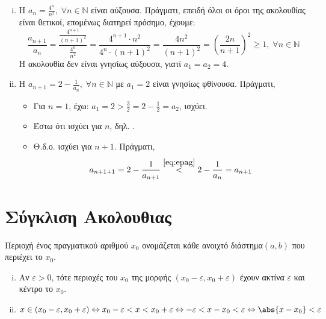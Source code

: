 \documentclass[main.tex]{subfiles}
\begin{document}
\begin{examples}
\begin{enumerate}[i)]
        \item Η $ a_{n}= \frac{4^{n}}{n^{2}}, \; \forall n \in \mathbb{N} $ 
            είναι αύξουσα. Πράγματι, επειδή όλοι οι όροι της ακολουθίας 
            είναι θετικοί, επομένως διατηρεί πρόσημο, έχουμε:
            \[
                \frac{a_{n+1}}{a_{n}} 
                = \frac{\frac{4^{n+1}}{(n+1)^{2}}}{\frac{4^{n}}{n^{2}}} 
                = \frac{4^{n+1}\cdot n^{2}}{4^{n}\cdot (n+1)^{2}} 
                = \frac{4n^{2}}{(n+1)^{2}}
                = \left( \frac{2n}{n+1} \right)^{2} \geq 1, 
                \; \forall n \in \mathbb{N} 
            \]
            Η ακολουθία δεν είναι γνησίως αύξουσα, γιατί $ 
            a_{1}= a_{2}=4$.

        \item Η $ a_{n+1}=2 - \frac{1}{a_{n}}, \; \forall n \in \mathbb{N}
            $ με $ a_{1} = 2 $ είναι γνησίως φθίνουσα. Πράγματι, 
            \begin{itemize}
                \item Για $ n=1 $, έχω: $ a_{1}= 2 >
                    \frac{3}{2} = 2 - \frac{1}{2} = a_{2}$, ισχύει.
                \item Έστω ότι ισχύει για $n$, δηλ.
                    .
                \item Θ.δ.ο. ισχύει για $ n+1 $. Πράγματι, 
                    \[
                        a_{n+1+1}=2- \frac{1}{a_{n+1}}
                        \overset{\eqref{eq:epag}}{<} 2 - 
                        \frac{1}{a_{n}} = a_{n+1}
                    \] 
            \end{itemize}
    \end{enumerate}
\end{examples}

\section{Σύγκλιση Ακολουθιας}

\begin{dfn}
    Περιοχή ένος πραγματικού αριθμού $ x_{0} $ ονομάζεται κάθε ανοιχτό 
    διάστημα$ (a,b)$ που περιέχει το $ x_{0} $. 
\end{dfn}

\begin{rem}
\item {}
    \begin{enumerate}[i)]
        \item 
            Αν $ \varepsilon > 0 $, τότε περιοχές του $ x_{0} $ της μορφής $ 
            (x_{0}- \varepsilon , x_{0} + \varepsilon) $ έχουν ακτίνα $ \varepsilon $
            και κέντρο το $ x_{0} $. 

        \item $ x \in (x_{0}- \varepsilon, x_{0} + \varepsilon) \Leftrightarrow
            x_{0}- \varepsilon < x < x_{0}+ \varepsilon \Leftrightarrow 
            - \varepsilon < x - x_{0} < \varepsilon \Leftrightarrow 
            \abs{x- x_{0}} < \varepsilon  $ 
    \end{enumerate}
\end{rem}
\end{document}
